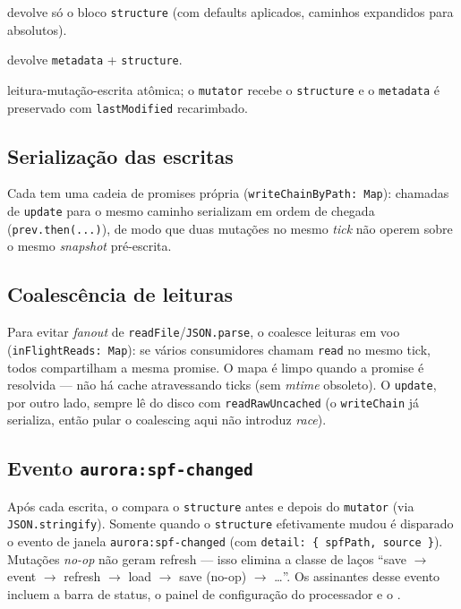 \begin{description}[leftmargin=2em,style=nextline]
  \item[\lstinline|read(spfPath)|] devolve só o bloco \lstinline|structure|
    (com defaults aplicados, caminhos expandidos para absolutos).
  \item[\lstinline|readFull(spfPath)|] devolve \lstinline|metadata| +
    \lstinline|structure|.
  \item[\lstinline|update(spfPath, mutator)|] leitura-mutação-escrita atômica;
    o \lstinline|mutator| recebe o \lstinline|structure| e o \lstinline|metadata|
    é preservado com \lstinline|lastModified| recarimbado.
\end{description}

\subsection{Serialização das escritas}

Cada  tem uma cadeia de promises própria
(\lstinline|writeChainByPath: Map|): chamadas de \lstinline|update| para o mesmo
caminho serializam em ordem de chegada (\lstinline|prev.then(...)|), de modo que
duas mutações no mesmo \emph{tick} não operem sobre o mesmo \emph{snapshot} pré-escrita.

\subsection{Coalescência de leituras}

Para evitar \emph{fanout} de \lstinline|readFile|/\lstinline|JSON.parse|, o
 coalesce leituras em voo (\lstinline|inFlightReads: Map|): se
vários consumidores chamam \lstinline|read| no mesmo tick, todos compartilham a
mesma promise. O mapa é limpo quando a promise é resolvida — não há cache
atravessando ticks (sem \emph{mtime} obsoleto). O \lstinline|update|, por outro
lado, sempre lê do disco com \lstinline|readRawUncached| (o \lstinline|writeChain|
já serializa, então pular o coalescing aqui não introduz \emph{race}).

\subsection{Evento \texttt{aurora:spf-changed}}

Após cada escrita, o  compara o \lstinline|structure| antes e
depois do \lstinline|mutator| (via \lstinline|JSON.stringify|). Somente quando o
\lstinline|structure| efetivamente mudou é disparado o evento de janela
\lstinline|aurora:spf-changed| (com \lstinline|detail: { spfPath, source }|).
Mutações \emph{no-op} não geram refresh — isso elimina a classe de laços
\enquote{save $\rightarrow$ event $\rightarrow$ refresh $\rightarrow$ load
$\rightarrow$ save (no-op) $\rightarrow$ \ldots}. Os assinantes desse evento
incluem a barra de status, o painel de configuração do processador e o
.

